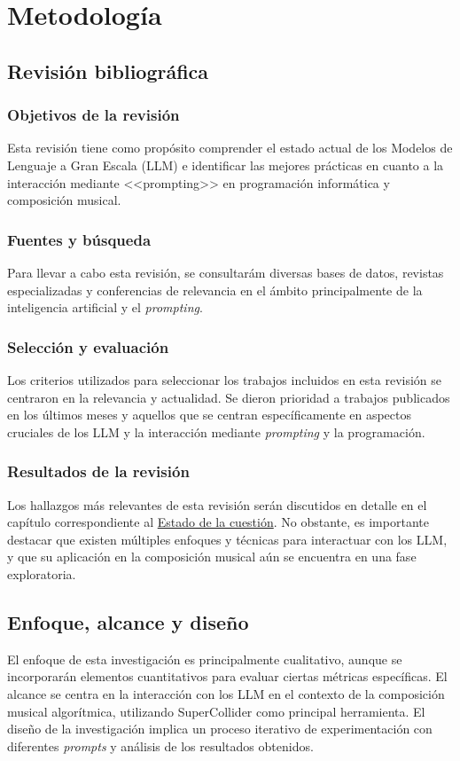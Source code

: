 \chapter{Metodología}

\section{Revisión bibliográfica}

\subsection{Objetivos de la revisión}
Esta revisión tiene como propósito comprender el estado actual de los Modelos de Lenguaje a Gran Escala (LLM) e identificar las mejores prácticas en cuanto a la interacción mediante <<prompting>> en programación informática y composición musical.

\subsection{Fuentes y búsqueda}
Para llevar a cabo esta revisión, se consultarám diversas bases de datos, revistas especializadas y conferencias de relevancia en el ámbito principalmente de la inteligencia artificial y el \textit{prompting}.

\subsection{Selección y evaluación}
Los criterios utilizados para seleccionar los trabajos incluidos en esta revisión se centraron en la relevancia y actualidad. Se dieron prioridad a trabajos publicados en los últimos meses y aquellos que se centran específicamente en aspectos cruciales de los LLM y la interacción mediante \textit{prompting} y la programación.

\subsection{Resultados de la revisión}
Los hallazgos más relevantes de esta revisión serán discutidos en detalle en el capítulo correspondiente al \hyperref[chap:estado_cuestion]{Estado de la cuestión}. No obstante, es importante destacar que existen múltiples enfoques y técnicas para interactuar con los LLM, y que su aplicación en la composición musical aún se encuentra en una fase exploratoria.

\section{Enfoque, alcance y diseño}
El enfoque de esta investigación es principalmente cualitativo, aunque se incorporarán elementos cuantitativos para evaluar ciertas métricas específicas. El alcance se centra en la interacción con los LLM en el contexto de la composición musical algorítmica, utilizando SuperCollider como principal herramienta. El diseño de la investigación implica un proceso iterativo de experimentación con diferentes \textit{prompts} y análisis de los resultados obtenidos.

